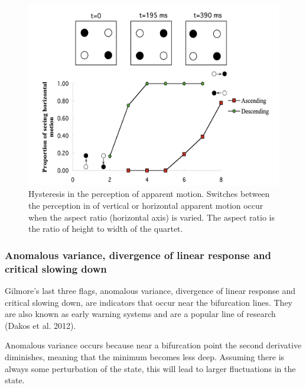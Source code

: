 \documentclass[
  a4paper,
  DIV=11,
  numbers=noendperiod]{scrreprt}
\begin{document}
\begin{figure}

{\centering \includegraphics{media/ch3/image22.jpg}

}

\caption{\label{fig-ch3-img22-old-34}Hysteresis in the perception of
apparent motion. Switches between the perception in of vertical or
horizontal apparent motion occur when the aspect ratio (horizontal axis)
is varied. The aspect ratio is the ratio of height to width of the
quartet.}

\end{figure}

\hypertarget{sec-Anomalous-variance-divergence-of-linear-response-and-critical-slowing-down}{%
\subsubsection{Anomalous variance, divergence of linear response and
critical slowing
down}\label{sec-Anomalous-variance-divergence-of-linear-response-and-critical-slowing-down}}

Gilmore's last three flags, anomalous variance, divergence of linear
response and critical slowing down, are indicators that occur near the
bifurcation lines. They are also known as early warning systems and are
a popular line of research (Dakos et al. 2012).

Anomalous variance occurs because near a bifurcation point the second
derivative diminishes, meaning that the minimum becomes less deep.
Assuming there is always some perturbation of the state, this will lead
to larger fluctuations in the state.
\end{document}

